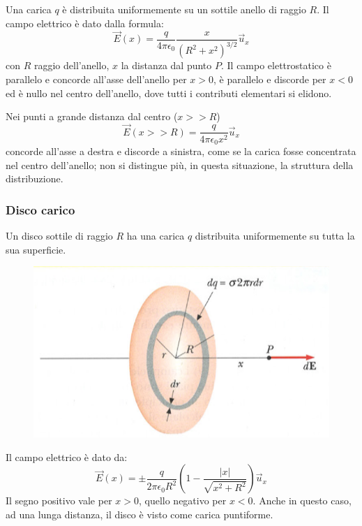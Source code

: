\documentclass[class=book, crop=false, oneside, 12pt]{standalone}
\begin{document}
Una carica \(q\) è distribuita uniformemente su un sottile anello di raggio \(R\).  
Il campo elettrico è dato dalla formula:
\begin{equation*}
    \overrightarrow{E} (x) = \frac{q}{4 \pi \epsilon_0} \frac{x}{\left(R^2 + x^2\right)^{3/2}} \overrightarrow{u}_x
\end{equation*}
con \(R\) raggio dell'anello, \(x\) la distanza dal punto \(P\).
Il campo elettrostatico è parallelo e concorde all'asse dell'anello per \(x > 0\), è parallelo e discorde per \(x < 0\) ed è nullo nel centro dell'anello, 
dove tutti i contributi elementari si elidono.

Nei punti a grande distanza dal centro (\(x >> R\)) 
\begin{equation*}
    \overrightarrow{E} (x>>R) =\frac{q}{4 \pi \epsilon_0 x^2} \overrightarrow{u}_x
\end{equation*}
concorde all'asse a destra e discorde a sinistra, come se la carica fosse concentrata nel centro dell'anello; non si distingue più, in questa situazione, la struttura della distribuzione.

\subsubsection*{Disco carico}

Un disco sottile di raggio \(R\) ha una carica \(q\) distribuita uniformemente su tutta la sua superficie.  
\begin{figure}[h]
    \includegraphics[scale=0.4]{disco_carico.png}
    \centering
    \caption{}
\end{figure}
Il campo elettrico è dato da:
\begin{equation*}
    \overrightarrow{E} (x) = \pm \frac{q}{2 \pi \epsilon_0 R^2} \left(1 - \frac{|x|}{\sqrt{x^2 + R^2}}\right) \overrightarrow{u}_x
\end{equation*}
Il segno positivo vale per \(x > 0\), quello negativo per \(x < 0\).  
Anche in questo caso, ad una lunga distanza, il disco è visto come carica puntiforme.  
\end{document}
